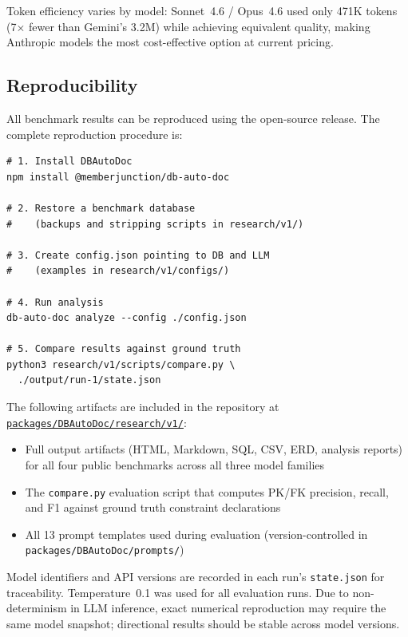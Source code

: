\documentclass[sigconf, nonacm]{acmart}
\begin{document}
Token efficiency varies by model: Sonnet~4.6 / Opus~4.6 used only 471K tokens (7$\times$ fewer than Gemini's 3.2M) while achieving equivalent quality, making Anthropic models the most cost-effective option at current pricing.

\subsection{Reproducibility}

All benchmark results can be reproduced using the open-source release. The complete reproduction procedure is:

\begin{verbatim}
# 1. Install DBAutoDoc
npm install @memberjunction/db-auto-doc

# 2. Restore a benchmark database
#    (backups and stripping scripts in research/v1/)

# 3. Create config.json pointing to DB and LLM
#    (examples in research/v1/configs/)

# 4. Run analysis
db-auto-doc analyze --config ./config.json

# 5. Compare results against ground truth
python3 research/v1/scripts/compare.py \
  ./output/run-1/state.json
\end{verbatim}

The following artifacts are included in the repository at \href{https://github.com/MemberJunction/MJ/tree/next/packages/DBAutoDoc/research/v1}{\texttt{packages/DBAutoDoc/research/v1/}}:
\begin{itemize}
    \item Full output artifacts (HTML, Markdown, SQL, CSV, ERD, analysis reports) for all four public benchmarks across all three model families
    \item The \texttt{compare.py} evaluation script that computes PK/FK precision, recall, and F1 against ground truth constraint declarations
    \item All 13 prompt templates used during evaluation (version-controlled in \texttt{packages/DBAutoDoc/prompts/})
\end{itemize}

Model identifiers and API versions are recorded in each run's \texttt{state.json} for traceability. Temperature~0.1 was used for all evaluation runs. Due to non-determinism in LLM inference, exact numerical reproduction may require the same model snapshot; directional results should be stable across model versions.


\end{document}

